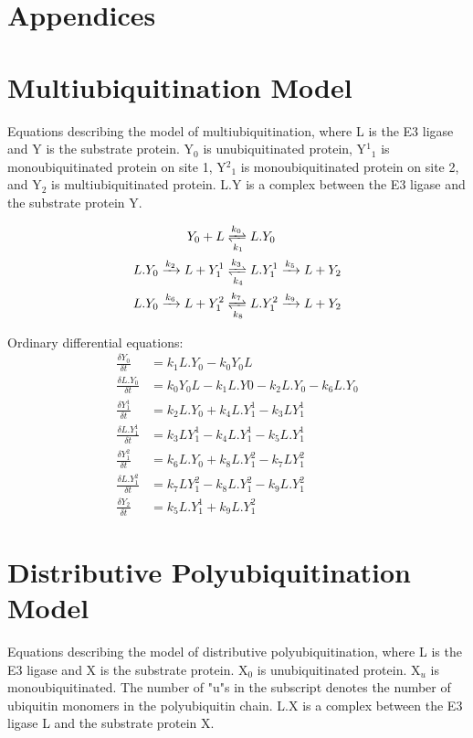 \documentclass[11pt]{article}
\begin{document}
\section{Appendices}
\appendix{}
\section{Multiubiquitination Model}
Equations describing the model of multiubiquitination, where L is the E3 ligase and Y is the substrate protein. Y$_0$ is unubiquitinated protein, Y$^1$$_1$ is monoubiquitinated protein on site 1, Y$^2$$_1$ is monoubiquitinated protein on site 2, and Y$_2$ is multiubiquitinated protein. L.Y is a complex between the E3 ligase and the substrate protein Y.

\begin{align}
   Y_0 + L &\xrightleftharpoons[k_1]{k_0} L.Y_0 \\
  L.Y_0 \xrightarrow[]{k_2} L + Y^1_1
  &\xrightleftharpoons[k_4]{k_3} L.Y^1_1
  \xrightarrow[]{k_5} L + Y_2 \\
  L.Y_0 \xrightarrow[]{k_6} L + Y^2_1
  &\xrightleftharpoons[k_8]{k_7} L.Y^2_1
  \xrightarrow[]{k_9} L + Y_2
\end{align}

Ordinary differential equations:
\begin{align}
  \frac{\delta Y_0}{\delta t} &= k_1 L.Y_0 - k_0 Y_0 L \\
  \frac{\delta L.Y_0}{\delta t} &= k_0 Y_0 L - k_1 L.Y0 - k_2 L.Y_0 - k_6 L.Y_0 \\
  \frac{\delta Y^1_1}{\delta t}& = k_2 L.Y_0 + k_4 L.Y^1_1 - k_3 L Y^1_1\\
  \frac{\delta L.Y^1_1}{\delta t} &= k_3 L Y^1_1 - k_4 L.Y^1_1 - k_5 L.Y^1_1 \\
  \frac{\delta Y^2_1}{\delta t} &= k_6 L.Y_0 + k_8 L.Y^2_1 - k_7 L Y^2_1 \\
  \frac{\delta L.Y^2_1}{\delta t} &= k_7 L Y^2_1 - k_8 L.Y^2_1 - k_9 L.Y^2_1\\
  \frac{\delta Y_2}{\delta t} &= k_5 L.Y^1_1 + k_9 L.Y^2_1 
\end{align}

\section{Distributive Polyubiquitination Model}
Equations describing the model of distributive polyubiquitination, where L is the E3 ligase and X is the substrate protein. X$_0$ is unubiquitinated protein. X$_u$ is monoubiquitinated. The number of "u"s in the subscript denotes the number of ubiquitin monomers in the polyubiquitin chain. L.X is a complex between the E3 ligase L and the substrate protein X.
\end{document}
